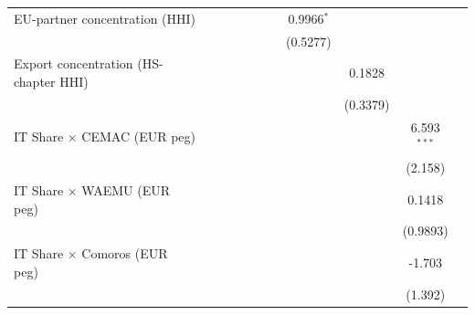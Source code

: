 \begin{tabular}{lcccccccccc}
   EU-partner concentration (HHI)                     &                &                 &                &                 &                &                & 0.9966$^{*}$     &                &                     &   \\   
                                                      &                &                 &                &                 &                &                & (0.5277)         &                &                     &   \\   
   Export concentration (HS-chapter HHI)              &                &                 &                &                 &                &                &                  & 0.1828         &                     &   \\   
                                                      &                &                 &                &                 &                &                &                  & (0.3379)       &                     &   \\   
   IT Share $\times$ CEMAC (EUR peg)                  &                &                 &                &                 &                &                &                  &                & 6.593$^{***}$       &   \\   
                                                      &                &                 &                &                 &                &                &                  &                & (2.158)             &   \\   
   IT Share $\times$ WAEMU (EUR peg)                  &                &                 &                &                 &                &                &                  &                & 0.1418              &   \\   
                                                      &                &                 &                &                 &                &                &                  &                & (0.9893)            &   \\   
   IT Share $\times$ Comoros (EUR peg)                &                &                 &                &                 &                &                &                  &                & -1.703              &   \\   
                                                      &                &                 &                &                 &                &                &                  &                & (1.392)             &   \\   

\end{tabular}
